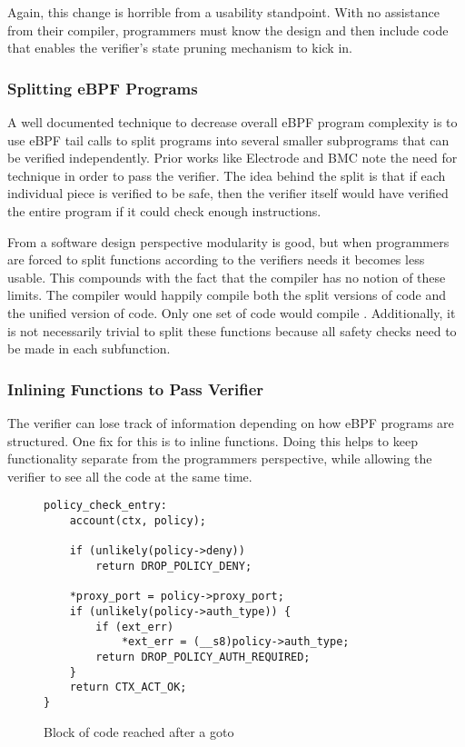 Again, this change is horrible from a usability standpoint.
With no assistance from their compiler, programmers must know the design and then include code that enables the verifier's state pruning mechanism to kick in.

\subsubsection{Splitting eBPF Programs}
A well documented technique to decrease overall eBPF program complexity is to use eBPF tail calls to split programs into several smaller subprograms that can be verified independently.
Prior works like Electrode and BMC note the need for technique in order to pass the verifier.
The idea behind the split is that if each individual piece is verified to be safe, then the verifier itself would have verified the entire program if it could check enough instructions.

From a software design perspective modularity is good, but when programmers are forced to split functions according to the verifiers needs it becomes less usable.
This compounds with the fact that the compiler has no notion of these limits.
The compiler would happily compile both the split versions of code and the unified version of code.
Only one set of code would compile .
Additionally, it is not necessarily trivial to split these functions because all safety checks need to be made in each subfunction.

\subsubsection{Inlining Functions to Pass Verifier}
The verifier can lose track of information depending on how eBPF programs are structured.
One fix for this is to inline functions.
Doing this helps to keep functionality separate from the programmers perspective, while allowing the verifier to see all the code at the same time.

\begin{figure}
    \begin{lstlisting}[language=myC]
policy_check_entry:
	account(ctx, policy);

	if (unlikely(policy->deny))
		return DROP_POLICY_DENY;

	*proxy_port = policy->proxy_port;
	if (unlikely(policy->auth_type)) {
		if (ext_err)
			*ext_err = (__s8)policy->auth_type;
		return DROP_POLICY_AUTH_REQUIRED;
	}
	return CTX_ACT_OK;
}
    \end{lstlisting}
    \caption{Block of code reached after a goto }
    \label{fig:inline-fig}
\end{figure}


